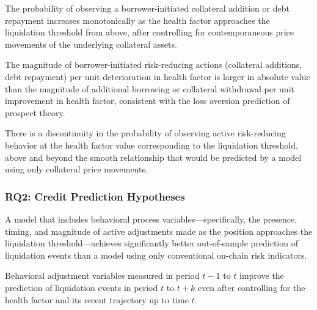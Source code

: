 \begin{description}[leftmargin=*,labelindent=\parindent, itemindent=0pt]
\item[H1a (Active Adjustment Occurrence).] The probability of observing a borrower-initiated collateral addition or debt repayment increases monotonically as the health factor approaches the liquidation threshold from above, after controlling for contemporaneous price movements of the underlying collateral assets.

\item[H1b (Loss Aversion Asymmetry).] The magnitude of borrower-initiated risk-reducing actions (collateral additions, debt repayment) per unit deterioration in health factor is larger in absolute value than the magnitude of additional borrowing or collateral withdrawal per unit improvement in health factor, consistent with the loss aversion prediction of prospect theory.

\item[H1c (Reference-Point Discontinuity).] There is a discontinuity in the probability of observing active risk-reducing behavior at the health factor value corresponding to the liquidation threshold, above and beyond the smooth relationship that would be predicted by a model using only collateral price movements.
\end{description}

\subsubsection*{RQ2: Credit Prediction Hypotheses}

\begin{description}[leftmargin=*,labelindent=\parindent, itemindent=0pt]
\item[H2a (Incremental Predictive Power).] A model that includes behavioral process variables—specifically, the presence, timing, and magnitude of active adjustments made as the position approaches the liquidation threshold—achieves significantly better out-of-sample prediction of liquidation events than a model using only conventional on-chain risk indicators.

\item[H2b (Temporal Precedence).] Behavioral adjustment variables measured in period \(t-1\) to \(t\) improve the prediction of liquidation events in period \(t\) to \(t+k\) even after controlling for the health factor and its recent trajectory up to time \(t\).
\end{description}

